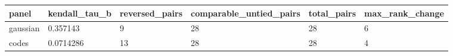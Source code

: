 \begin{tabular}{llllll}
\toprule
panel & kendall\_tau\_b & reversed\_pairs & comparable\_untied\_pairs & total\_pairs & max\_rank\_change \\
\midrule
gaussian & 0.357143 & 9 & 28 & 28 & 6 \\
codes & 0.0714286 & 13 & 28 & 28 & 4 \\
\bottomrule
\end{tabular}
